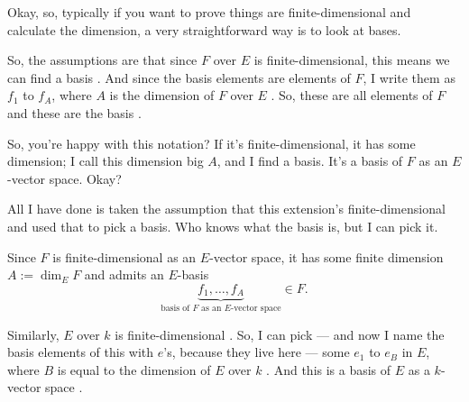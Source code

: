 \begin{proofWrapper}

\begin{speech}[00:25:01 - 00:26:18]
Okay, so, typically if you want to prove things are finite-dimensional and calculate the dimension, a very straightforward way is to look at bases.

So, the assumptions are that since $F$ over $E$  is finite-dimensional, this means we can find a basis . And since the basis elements are elements of $F$, I write them as $f_1$ to $f_A$, where $A$ is the dimension of $F$ over $E$ . So, these are all elements of $F$ and these are the basis .

So, you're happy with this notation? If it's finite-dimensional, it has some dimension; I call this dimension big $A$, and I find a basis. It's a basis of $F$ as an $E$-vector space. Okay?

All I have done is taken the assumption that this extension's finite-dimensional and used that to pick a basis. Who knows what the basis is, but I can pick it.
\end{speech}

\begin{content}
Since $F$ is finite-dimensional as an $E$-vector space, it has some finite dimension $A := \dim_E F$ and admits an $E$-basis
\[
\underbrace{f_1, \dots, f_A}_{\text{basis of } F \text{ as an } E\text{-vector space}} \in F.
\]
\end{content}

\begin{speech}[00:26:18 - 00:27:20]
Similarly, $E$ over $k$  is finite-dimensional . So, I can pick --- and now I name the basis elements of this with $e$'s, because they live here --- some $e_1$ to $e_B$ in $E$, where $B$ is equal to the dimension of $E$ over $k$ . And this is a basis of $E$ as a $k$-vector space .


\end{speech}
\end{proofWrapper}

